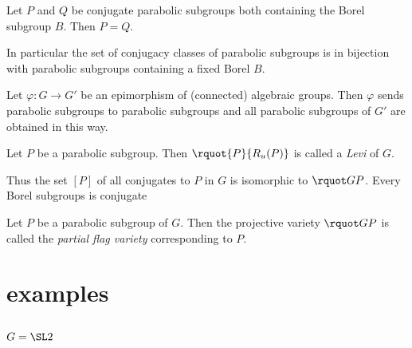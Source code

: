 \documentclass[english, no-theorem-numbers]{short-notes}
\begin{document}
\begin{Prop}
    Let $P$ and $Q$ be conjugate parabolic subgroups both containing the Borel subgroup $B$.
    Then $P = Q$.

    In particular the set of conjugacy classes of parabolic subgroups is in bijection with parabolic subgroups containing a fixed Borel $B$.
\end{Prop}

\begin{Prop}
    Let $φ\colon G → G'$ be an epimorphism of (connected) algebraic groups.
    Then $φ$ sends parabolic subgroups to parabolic subgroups and all parabolic subgroups of $G'$ are obtained in this way.
\end{Prop}

\begin{Def}
    Let $P$ be a parabolic subgroup.
    Then $\rquot{P}{R_u(P)}$ is called a \emph{Levi} of $G$.
\end{Def}

Thus the set $[P]$ of all conjugates to $P$ in $G$ is isomorphic to $\rquot GP$.
Every Borel subgroups is conjugate

\begin{Def}
    Let $P$ be a parabolic subgroup of $G$.
    Then the projective variety $\rquot GP$ is called the \emph{partial flag variety} corresponding to $P$.
\end{Def}



\section*{examples}

\subsection*{\texorpdfstring{$G = \SL2$}{G = SL2}}
\end{document}
